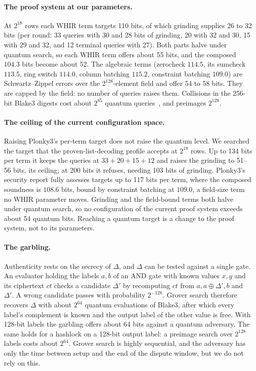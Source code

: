 \documentclass[11pt]{article}
\newcommand{\AND}{\textsf{AND}}
\begin{document}
\paragraph{The proof system at our parameters.} At $2^{18}$ rows each WHIR term
targets 110 bits, of which grinding supplies 26 to 32 bits (per round: 33
queries with 30 and 28 bits of grinding, 20 with 32 and 30, 15 with 29 and 32, and
12 terminal queries with 27). Both parts halve under quantum search, so each WHIR
term offers about 55 bits, and the composed $104.3$ bits become about 52. The
algebraic terms (zerocheck $114.5$, its sumcheck $113.5$, ring switch $114.0$,
column batching $115.2$, constraint batching $109.0$) are Schwartz--Zippel errors
over the $2^{128}$-element field and offer 54 to 58 bits. They are capped by the
field: no number of queries raises them. Collisions in the 256-bit Blake3
digests cost about $2^{85}$ quantum queries~\cite{bht98}, and preimages
$2^{128}$.

\paragraph{The ceiling of the current configuration space.} Raising Plonky3's
per-term target does not raise the quantum level. We searched the target that
the proven-list-decoding profile accepts at $2^{18}$ rows. Up to 134 bits per term
it keeps the queries at $33+20+15+12$ and raises the grinding to 51--56 bits,
its ceiling; at 200 bits it refuses, needing 103 bits of grinding. Plonky3's
security report fully assesses targets up to 117 bits per term, where the
composed soundness is $108.6$ bits, bound by constraint batching at $109.0$, a
field-size term no WHIR parameter moves. Grinding and the field-bound terms both
halve under quantum search, so no configuration of the current proof system
exceeds about 54 quantum bits. Reaching a quantum target is a change to the
proof system, not to its parameters.

\paragraph{The garbling.} Authenticity rests on the secrecy of $\Delta$, and
$\Delta$ can be tested against a single gate. An evaluator holding the labels
$a,b$ of an \AND{} gate with known values $x,y$ and its ciphertext $\mathit{ct}$
checks a candidate $\Delta'$ by recomputing $\mathit{ct}$ from
$a,a\oplus\Delta',b$ and $\Delta'$. A wrong candidate passes with probability
$2^{-128}$. Grover search therefore recovers $\Delta$ with about $2^{64}$
quantum evaluations of Blake3, after which every label's complement is known
and the output label of the other value is free. With 128-bit labels the
garbling offers about 64 bits against a quantum adversary. The same holds for a
hashlock on a 128-bit output label: a preimage search over $2^{128}$ labels costs
about $2^{64}$. Grover search is highly sequential, and the adversary has only the
time between setup and the end of the dispute window, but we do not rely on
this.
\end{document}
